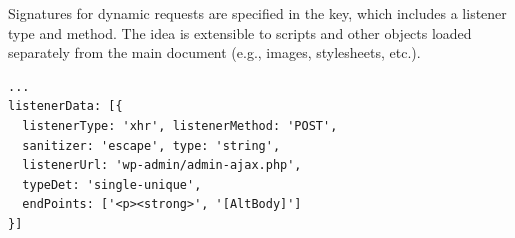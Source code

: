 Signatures for dynamic requests are specified in the 
key, which includes a listener type and method. The idea is extensible
to scripts and other objects loaded separately from the main document
(e.g., images, stylesheets, etc.).

\begin{lstlisting}[breaklines=true,caption={
      An example dynamic request signature. This patches CVE-2018-7747.
    },label={lst:dynamic_signature}]
...
listenerData: [{
  listenerType: 'xhr', listenerMethod: 'POST',
  sanitizer: 'escape', type: 'string',
  listenerUrl: 'wp-admin/admin-ajax.php',
  typeDet: 'single-unique',
  endPoints: ['<p><strong>', '[AltBody]']
}]
\end{lstlisting}

